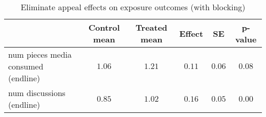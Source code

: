 \begin{table*}[ht]
\caption{Eliminate appeal effects on exposure outcomes (with blocking)\label{round}} 
\begin{center}
\begin{tabular}{lccccc}
\hline\hline
\multicolumn{1}{l}{}&\multicolumn{1}{c}{Control mean}&\multicolumn{1}{c}{Treated mean}&\multicolumn{1}{c}{Effect}&\multicolumn{1}{c}{SE}&\multicolumn{1}{c}{p-value}\tabularnewline
\hline
num pieces media consumed (endline)&$1.06$&$1.21$&$0.11$&$0.06$&$0.08$\tabularnewline
num discussions (endline)&$0.85$&$1.02$&$0.16$&$0.05$&$0.00$\tabularnewline
\hline
\end{tabular}\end{center}

\end{table*}
